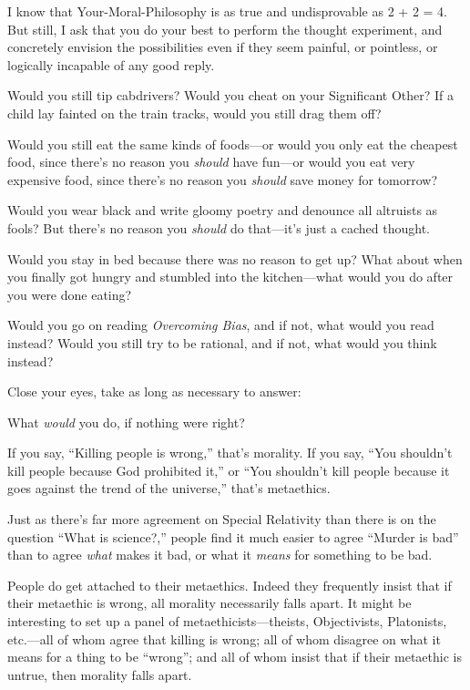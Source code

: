  I know that Your-Moral-Philosophy is as true and undisprovable as
2 + 2 = 4. But still, I ask that you do your best to perform the
thought experiment, and concretely envision the possibilities even if
they seem painful, or pointless, or logically incapable of any good
reply.


 Would you still tip cabdrivers? Would you cheat on your
Significant Other? If a child lay fainted on the train tracks, would
you still drag them off?


 Would you still eat the same kinds of foods---or would you only
eat the cheapest food, since there's no reason you
\textit{should} have fun---or would you eat very expensive food, since
there's no reason you \textit{should} save money for
tomorrow?


 Would you wear black and write gloomy poetry and denounce all
altruists as fools? But there's no reason you
\textit{should} do that---it's just a cached thought.


 Would you stay in bed because there was no reason to get up? What
about when you finally got hungry and stumbled into the kitchen---what
would you do after you were done eating?


 Would you go on reading \textit{Overcoming Bias}, and if not, what
would you read instead? Would you still try to be rational, and if not,
what would you think instead?


 Close your eyes, take as long as necessary to answer:


 What \textit{would} you do, if nothing were right?

\myendsectiontext



 If you say, ``Killing people is
wrong,'' that's morality. If you say,
``You shouldn't kill people because
God prohibited it,'' or ``You
shouldn't kill people because it goes against the trend
of the universe,'' that's
metaethics.


 Just as there's far more agreement on Special
Relativity than there is on the question ``What is
science?,'' people find it much easier to agree
``Murder is bad'' than to agree
\textit{what} makes it bad, or what it \textit{means} for something to
be bad.


 People do get attached to their metaethics. Indeed they frequently
insist that if their metaethic is wrong, all morality necessarily falls
apart. It might be interesting to set up a panel of
metaethicists---theists, Objectivists, Platonists, etc.---all of whom
agree that killing is wrong; all of whom disagree on what it means for
a thing to be ``wrong''; and all of
whom insist that if their metaethic is untrue, then morality falls
apart.


